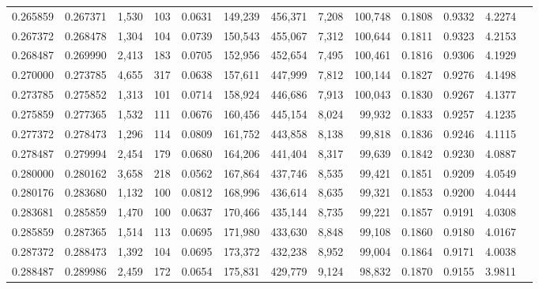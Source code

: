 \begin{tabular}{rrrrrrrrrrrrr}
0.265859 & 0.267371 & 1,530 & 103 &                                     0.0631 & 149,239 & 456,371 &   7,208 & 100,748 & 0.1808 & 0.9332 & 4.2274 \\
0.267372 & 0.268478 & 1,304 & 104 &                                     0.0739 & 150,543 & 455,067 &   7,312 & 100,644 & 0.1811 & 0.9323 & 4.2153 \\
0.268487 & 0.269990 & 2,413 & 183 &                                     0.0705 & 152,956 & 452,654 &   7,495 & 100,461 & 0.1816 & 0.9306 & 4.1929 \\
0.270000 & 0.273785 & 4,655 & 317 &                                     0.0638 & 157,611 & 447,999 &   7,812 & 100,144 & 0.1827 & 0.9276 & 4.1498 \\
0.273785 & 0.275852 & 1,313 & 101 &                                     0.0714 & 158,924 & 446,686 &   7,913 & 100,043 & 0.1830 & 0.9267 & 4.1377 \\
0.275859 & 0.277365 & 1,532 & 111 &                                     0.0676 & 160,456 & 445,154 &   8,024 &  99,932 & 0.1833 & 0.9257 & 4.1235 \\
0.277372 & 0.278473 & 1,296 & 114 &                                     0.0809 & 161,752 & 443,858 &   8,138 &  99,818 & 0.1836 & 0.9246 & 4.1115 \\
0.278487 & 0.279994 & 2,454 & 179 &                                     0.0680 & 164,206 & 441,404 &   8,317 &  99,639 & 0.1842 & 0.9230 & 4.0887 \\
0.280000 & 0.280162 & 3,658 & 218 &                                     0.0562 & 167,864 & 437,746 &   8,535 &  99,421 & 0.1851 & 0.9209 & 4.0549 \\
0.280176 & 0.283680 & 1,132 & 100 &                                     0.0812 & 168,996 & 436,614 &   8,635 &  99,321 & 0.1853 & 0.9200 & 4.0444 \\
0.283681 & 0.285859 & 1,470 & 100 &                                     0.0637 & 170,466 & 435,144 &   8,735 &  99,221 & 0.1857 & 0.9191 & 4.0308 \\
0.285859 & 0.287365 & 1,514 & 113 &                                     0.0695 & 171,980 & 433,630 &   8,848 &  99,108 & 0.1860 & 0.9180 & 4.0167 \\
0.287372 & 0.288473 & 1,392 & 104 &                                     0.0695 & 173,372 & 432,238 &   8,952 &  99,004 & 0.1864 & 0.9171 & 4.0038 \\
0.288487 & 0.289986 & 2,459 & 172 &                                     0.0654 & 175,831 & 429,779 &   9,124 &  98,832 & 0.1870 & 0.9155 & 3.9811 \\

\end{tabular}
